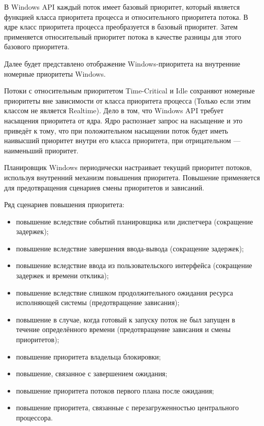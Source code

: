 В Windows API каждый поток имеет базовый приоритет, который является
функцией класса приоритета процесса и относительного приоритета потока. 
В ядре класс приоритета процесса преобразуется в базовый приоритет. Затем
применяется относительный приоритет потока в качестве разницы для этого 
базового приоритета.

Далее будет представлено отображение Windows-приоритета на внутренние
номерные приоритеты Windows.


Потоки с относительным приоритетом Time-Critical и Idle сохраняют
номерные приоритеты вне зависимости от класса приоритета процесса (Только
если этим классом не является Realtime). Дело в том, что Windows API
требует насыщения приоритета от ядра. Ядро распознает запрос на насыщение 
и это приведёт к тому, что при положительном насыщении поток будет иметь
наивысший приоритет внутри его класса приоритета, при отрицательном --- 
наименьший приоритет.

Планировщик Windows периодически настраивает текущий приоритет 
потоков, используя внутренний механизм повышения приоритета. 
Повышение применяется для предотвращения сценариев смены 
приоритетов и зависаний.

Ряд сценариев повышения приоритета:
\begin{itemize}
	\item повышение вследствие событий планировщика или диспетчера (сокращение задержек);
	\item повышение вследствие завершения ввода-вывода (сокращение задержек);
	\item повышение вследствие ввода из пользовательского интерфейса (сокращение задержек и времени отклика);
	\item повышение вследствие слишком продолжительного 
	ожидания ресурса исполняющей системы (предотвращение зависания);
	\item повышение в случае, когда готовый к запуску поток не был запущен в 
	течение определённого времени (предотвращение зависания и смены приоритетов);
	\item повышение приоритета владельца блокировки;
	\item повышение, связанное с завершением ожидания;
	\item повышение приоритета потоков первого плана после ожидания;
	\item повышение приоритета, связанные с перезагруженностью центрального процессора.
\end{itemize}

